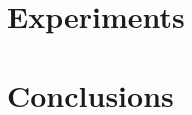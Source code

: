 \documentclass[sigconf]{acmart}
\begin{document}
\section{Experiments}

\section{Conclusions}


\newpage




\appendix

\end{document}
